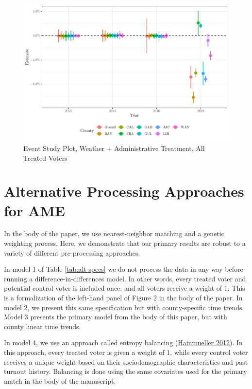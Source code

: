 \documentclass[
  12pt,
]{article}
\begin{document}
\begin{figure}[H]

{\centering \includegraphics{si_files/figure-latex/es1-1} 

}

\caption{\label{fig:es-1}Event Study Plot, Weather + Administrative Treatment, All Treated Voters}\label{fig:es1}
\end{figure}

\hypertarget{alternative-processing-approaches-for-ame}{%
\section*{Alternative Processing Approaches for AME}\label{alternative-processing-approaches-for-ame}}

In the body of the paper, we use nearest-neighbor matching and a genetic weighting process. Here, we demonstrate that our primary results are robust to a variety of different pre-processing approaches.

In model 1 of Table \ref{tab:alt-specs} we do not process the data in any way before running a difference-in-differences model. In other words, every treated voter and potential control voter is included once, and all voters receive a weight of 1. This is a formalization of the left-hand panel of Figure 2 in the body of the paper. In model 2, we present this same specification but with county-specific time trends. Model 3 presents the primary model from the body of this paper, but with county linear time trends.

In model 4, we use an approach called entropy balancing (\protect\hyperlink{ref-Hainmueller2012}{Hainmueller 2012}). In this approach, every treated voter is given a weight of 1, while every control voter receives a unique weight based on their sociodemographic characteristics and past turnout history. Balancing is done using the same covariates used for the primary match in the body of the manuscript.
\end{document}
